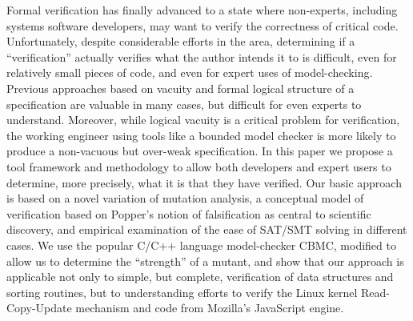 Formal verification has finally advanced to a state where non-experts, including systems software developers, may want to verify the correctness of critical code.  Unfortunately, despite considerable efforts in the area, determining if a ``verification'' actually verifies what the author intends it to is difficult, even for relatively small pieces of code, and even for expert uses of model-checking.  Previous approaches based on vacuity and formal logical structure of a specification are valuable in many cases, but difficult for even experts to understand.  Moreover, while logical vacuity is a critical problem for verification, the working engineer using tools like a bounded model checker is more likely to produce a non-vacuous but over-weak specification.  In this paper we propose a tool framework and methodology to allow both developers and expert users to determine, more precisely, what it is that they have verified.  Our basic approach is based on a novel variation of mutation analysis, a conceptual model of verification based on Popper's notion of falsification as central to scientific discovery, and empirical examination of the ease of SAT/SMT solving in different cases.  We use the popular C/C++ language model-checker CBMC, modified to allow us to determine the ``strength'' of a mutant, and show that our approach is applicable not only to simple, but complete, verification of data structures and sorting routines, but to understanding efforts to verify the Linux kernel Read-Copy-Update mechanism and code from Mozilla's JavaScript engine.
